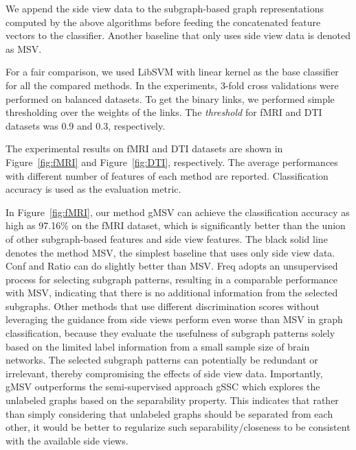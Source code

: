 \documentclass[conference]{IEEEtran}
\newcommand{\galgo}[0]{gMSV}
\newcommand{\gssc}[0]{gSSC}
\newcommand{\duga}[0]{Conf}
\newcommand{\dugb}[0]{Ratio}
\newcommand{\topk}[0]{Freq}
\newcommand{\side}[0]{MSV}
\begin{document}
We append the side view data to the subgraph-based graph representations computed by the above algorithms before feeding the concatenated feature vectors to the classifier. Another baseline that only uses side view data is denoted as {\side}.

For a fair comparison, we used LibSVM \cite{libsvm} with linear kernel as the base classifier for all the compared methods. In the experiments, 3-fold cross validations were performed on balanced datasets. To get the binary links, we performed simple thresholding over the weights of the links. The \emph{threshold} for fMRI and DTI datasets was 0.9 and 0.3, respectively. 

The experimental results on fMRI and DTI datasets are shown in Figure~\ref{fig:fMRI} and Figure~\ref{fig:DTI}, respectively. The average performances with different number of features of each method are reported. Classification accuracy is used as the evaluation metric.

In Figure~\ref{fig:fMRI}, our method {\galgo} can achieve the classification accuracy as high as 97.16\% on the fMRI dataset, which is significantly better than the union of other subgraph-based features and side view features. The black solid line denotes the method {\side}, the simplest baseline that uses only side view data. {\duga} and {\dugb} can do slightly better than {\side}. {\topk} adopts an unsupervised process for selecting subgraph patterns, resulting in a comparable performance with {\side}, indicating that there is no additional information from the selected subgraphs. Other methods that use different discrimination scores without leveraging the guidance from side views perform even worse than {\side} in graph classification, because they evaluate the usefulness of subgraph patterns solely based on the limited label information from a small sample size of brain networks. The selected subgraph patterns can potentially be redundant or irrelevant, thereby compromising the effects of side view data. Importantly, {\galgo} outperforms the semi-supervised approach {\gssc} which explores the unlabeled graphs based on the separability property. This indicates that rather than simply considering that unlabeled graphs should be separated from each other, it would be better to regularize such separability/closeness to be consistent with the available side views.
 
\end{document}
